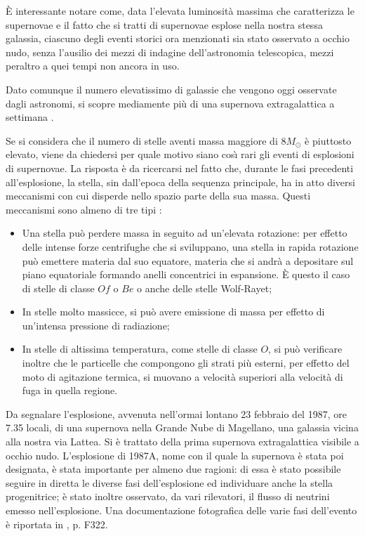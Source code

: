 \`E interessante notare come, data l'elevata luminosit\`{a} massima che caratterizza le supernovae e il fatto che si tratti di supernovae esplose nella nostra stessa galassia, ciascuno degli eventi storici ora menzionati sia stato osservato a occhio nudo, senza l'ausilio dei mezzi di indagine dell'astronomia telescopica, mezzi peraltro a quei tempi non ancora in uso.
\par
Dato comunque il numero elevatissimo di galassie che vengono oggi osservate dagli astronomi, si scopre mediamente più di una supernova extragalattica a settimana \Cite{battistini}.
\par
Se si considera che il numero di stelle aventi massa maggiore di $8M_{\odot}$ è piuttosto elevato, viene da chiedersi per quale motivo siano cos\`{\i}{} rari gli eventi di esplosioni di supernovae. La risposta è da ricercarsi nel fatto che, durante le fasi precedenti all'esplosione, la stella, sin dall'epoca della sequenza principale, ha in atto diversi meccanismi con cui disperde nello spazio parte della sua massa. Questi meccanismi sono almeno di tre tipi \Cite{rosino}:
\begin{itemize}
\item
Una stella può perdere massa in seguito ad un'elevata rotazione: per effetto delle intense forze centrifughe che si sviluppano, una stella in rapida rotazione può emettere materia dal suo equatore, materia che si andr\`{a} a depositare sul piano equatoriale formando anelli concentrici in espansione. \`E questo il caso di stelle di classe $Of$ o $Be$ o anche delle stelle Wolf-Rayet;
\item
In stelle molto massicce, si può avere emissione di massa per effetto di un'intensa pressione di radiazione;
\item
In stelle di altissima temperatura, come stelle di classe $O$, si può verificare inoltre che le particelle che compongono gli strati più esterni, per effetto del moto di agitazione termica, si muovano a velocit\`{a} superiori alla velocit\`{a} di fuga in quella regione.
\end{itemize}
Da  segnalare l'esplosione, avvenuta nell'ormai lontano 23 febbraio del 1987, ore 7.35 locali, di una supernova nella Grande Nube di Magellano, una galassia vicina alla nostra via Lattea. Si è trattato della prima supernova extragalattica visibile a occhio nudo. L'esplosione di 1987A, nome con il quale la supernova è stata poi designata, è stata importante per almeno due ragioni: di essa è stato possibile seguire in diretta le diverse fasi dell'esplosione ed individuare anche la stella progenitrice; è stato inoltre osservato, da vari rilevatori, il flusso di neutrini emesso nell'esplosione.
Una documentazione fotografica delle varie fasi dell'evento è riportata in \Cite{caf}, p. F322.
\par

